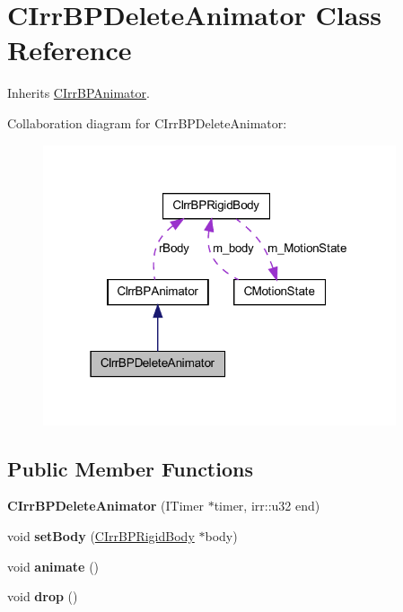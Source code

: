 \hypertarget{class_c_irr_b_p_delete_animator}{
\section{CIrrBPDeleteAnimator Class Reference}
\label{class_c_irr_b_p_delete_animator}
}


Inherits \hyperlink{class_c_irr_b_p_animator}{CIrrBPAnimator}.



Collaboration diagram for CIrrBPDeleteAnimator:\nopagebreak
\begin{figure}[H]
\begin{center}
\leavevmode
\includegraphics[width=295pt]{class_c_irr_b_p_delete_animator__coll__graph}
\end{center}
\end{figure}
\subsection*{Public Member Functions}
\begin{DoxyCompactItemize}
\item 
\hypertarget{class_c_irr_b_p_delete_animator_a2eef152cff22579d3c706a2444b611ec}{
{\bfseries CIrrBPDeleteAnimator} (ITimer $\ast$timer, irr::u32 end)}
\label{class_c_irr_b_p_delete_animator_a2eef152cff22579d3c706a2444b611ec}

\item 
\hypertarget{class_c_irr_b_p_delete_animator_a0ff69f375c5a499c7d07e81bc93168a3}{
void {\bfseries setBody} (\hyperlink{class_c_irr_b_p_rigid_body}{CIrrBPRigidBody} $\ast$body)}
\label{class_c_irr_b_p_delete_animator_a0ff69f375c5a499c7d07e81bc93168a3}

\item 
\hypertarget{class_c_irr_b_p_delete_animator_a41ce1c90f4f4f316e3a08a5a431a5769}{
void {\bfseries animate} ()}
\label{class_c_irr_b_p_delete_animator_a41ce1c90f4f4f316e3a08a5a431a5769}

\item 
\hypertarget{class_c_irr_b_p_delete_animator_a10fcff4d2fd949ea59596a827a76a057}{
void {\bfseries drop} ()}
\label{class_c_irr_b_p_delete_animator_a10fcff4d2fd949ea59596a827a76a057}

\end{DoxyCompactItemize}


